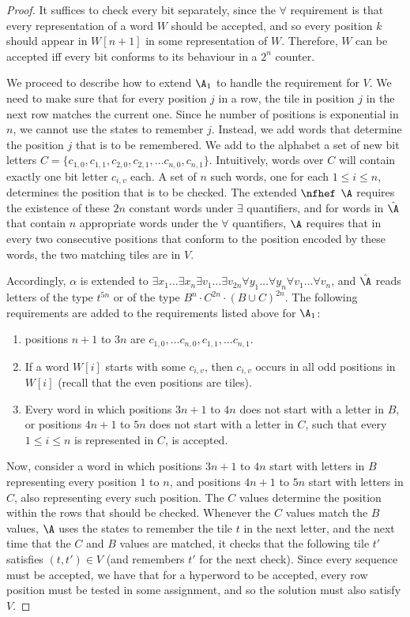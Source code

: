 \begin{proof}
It suffices to check every bit separately, since the $\forall$ requirement is that every representation of a word $W$ should be accepted, and so every position $k$ should appear in $W[n+1]$ in some representation of $W$. Therefore, $W$ can be accepted iff every bit conforms to its behaviour in a $2^n$ counter. 

We proceed to describe how to extend $\A_1$ to handle the requirement for $V$. 
We need to make sure that for every position $j$ in a row, the tile in position $j$ in the next row matches the current one. Since he number of positions is exponential in $n$, we cannot use the states to remember $j$.
Instead, we add words that determine the position $j$ that is to be remembered. 
We add to the alphabet a set of new bit letters $C = \{c_{1,0},c_{1,1},c_{2,0},c_{2,1},\ldots c_{n,0}, c_{n,1}\}$. 
Intuitively, words over $C$ will contain exactly one bit letter $c_{i,v}$ each. A set of $n$ such words, one for each $1\leq i\leq n$, determines the position that is to be checked. 
The extended $\nfhef$ $\A$ requires the existence of these $2n$ constant words under $\exists$ quantifiers, and for words in $\hat\A$ that contain $n$ appropriate words under the $\forall$ quantifiers, $\A$ requires that in every two consecutive positions that conform to the position encoded by these words, the two matching tiles are in $V$. 

Accordingly, $\alpha$ is extended to $\exists x_1\ldots \exists x_n \exists v_1 \ldots \exists v_{2n} \forall y_1\ldots \forall y_n \forall v_1\ldots \forall v_n$, and $\hat\A$ reads letters of the type $t^{5n}$ or of the type $B^n\cdot C^{2n} \cdot (B\cup C)^{2n}$. 
The following requirements are added to the requirements listed above for $\A_1$:
\begin{enumerate}
    \item positions $n+1$ to $3n$ are  $c_{1,0},\ldots c_{n,0}, c_{1,1},\ldots c_{n,1}$.
    \item If a word $W[i]$ starts with some $c_{i,v}$, then $c_{i,v}$ occurs in all odd positions in $W[i]$ (recall that the even positions are tiles). 
    \item Every word in which positions $3n+1$ to $4n$ does not start with a letter in $B$, or positions $4n+1$ to $5n$ does not start with a letter in $C$, such that every $1\leq i \leq n$ is represented in $C$, is accepted. 
\end{enumerate}

Now, consider a word in which positions $3n+1$ to $4n$ start with letters in $B$ representing every position $1$ to $n$, and positions $4n+1$ to $5n$ start with letters in $C$, also representing every such position. 
The $C$ values determine the position within the rows that should be checked. Whenever the $C$ values match the $B$ values, $\A$ uses the states to remember the tile $t$ in the next letter, and the next time that the $C$ and $B$ values are matched, it checks that the following tile $t'$ satisfies $(t,t')\in V$ (and remembers $t'$ for the next check).
Since every sequence must be accepted, we have that for a hyperword to be accepted, every row position must be tested in some assignment, and so the solution must also satisfy $V$.

\end{proof}
